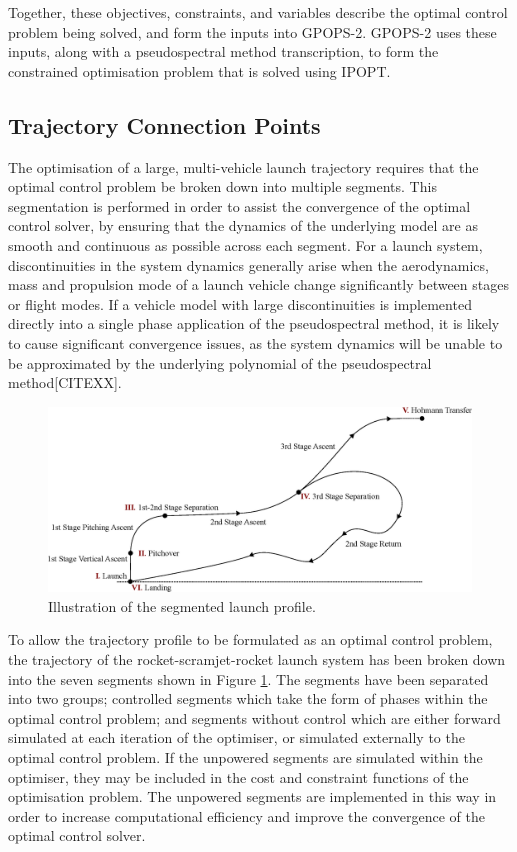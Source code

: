 Together, these objectives, constraints, and variables describe the optimal control problem being solved, and form the inputs into GPOPS-2. GPOPS-2 uses these inputs, along with a pseudospectral method transcription, to form the constrained optimisation problem that is solved using IPOPT.









\subsection{Trajectory Connection Points}
The optimisation of a large, multi-vehicle launch trajectory requires that the optimal control problem be broken down into multiple segments. This segmentation is performed in order to assist the convergence of the optimal control solver, by ensuring that the dynamics of the underlying model are as smooth and continuous as possible across each segment. 
For a launch system, discontinuities in the system dynamics generally arise when the aerodynamics, mass and propulsion mode of a launch vehicle change significantly between stages or flight modes. 
If a vehicle model with large discontinuities is implemented directly into a single phase application of the pseudospectral method, it is likely to cause significant convergence issues, as the system dynamics will be unable to be approximated by the underlying polynomial of the pseudospectral method[CITEXX]. 
 \begin{figure}[ht]
 	\centering
 	\includegraphics[width=1.\linewidth]{figures/4_LODESTAR/Traj}
 	\caption{Illustration of the segmented launch profile.}
 	\label{fig:Traj}
 \end{figure}
 
 To allow the trajectory profile to be formulated as an optimal control problem, the trajectory of the rocket-scramjet-rocket launch system has been broken down into the seven segments shown in Figure \ref{fig:Traj}. 
  The segments have been separated into two groups; controlled segments which take the form of phases within the optimal control problem; and segments without control which are either forward simulated at each iteration of the optimiser, or simulated externally to the optimal control problem. If the unpowered segments are simulated within the optimiser, they may be included in the cost and constraint functions of the optimisation problem.
  The unpowered segments are implemented in this way in order to increase computational efficiency and improve the convergence of the optimal control solver. 
  
